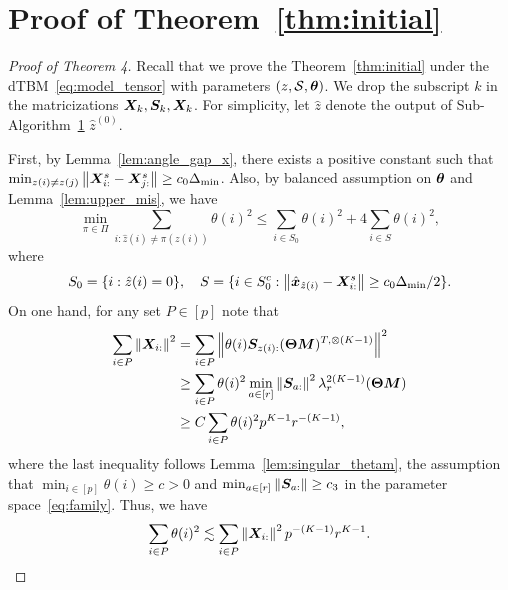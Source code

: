 \documentclass[lettersize,journal]{IEEEtran}
\theoremstyle{definition}
\theoremstyle{definition}
\begin{document}
\section*{Proof of Theorem~\ref{thm:initial}}
\begin{proof}[Proof of Theorem 4] Recall that we prove the Theorem~\ref{thm:initial} under the dTBM~\eqref{eq:model_tensor} with parameters $(z, \mathcal{S}, \boldsymbol{\theta})$. We drop the subscript $k$ in the matricizations $\bm X_k, \bm S_k, \bm X_k$. For simplicity, let $\hat z$ denote the output of Sub-Algorithm~\hyperref[alg:main]{1} $\hat z^{(0)}$.

First, by Lemma~\ref{lem:angle_gap_x}, there exists a positive constant such that $\min_{z(i) \neq z(j)} \left\lVert \bm X^s_{i:} - \bm X^s_{j:} \right\rVert \geq c_0  \Delta_{\min}$. Also, by balanced assumption on $\boldsymbol{\theta}$ and Lemma~\ref{lem:upper_mis}, we have 
 \begin{equation}\label{eq:theta_bound}
          \min_{\pi \in \Pi} \sum_{i : \hat z(i) \neq \pi(z(i))} \theta(i)^2  \leq  \sum_{i \in S_0} \theta(i)^2 + 4 \sum_{i \in S} \theta(i)^2 ,
    \end{equation}
    where 
    \begin{equation}
        S_0 = \{i: \hat z(i) = 0\}, \quad S = \{i \in S_0^c: \left\lVert\hat {\bm x}_{\hat z(i)} - \bm X_{i:}^s \right\rVert \geq c_0  \Delta_{\min}/2\}.
    \end{equation}
    On one hand, for any set $P \in [p]$ note that 
    \begin{align}
        \sum_{i \in P} \left\lVert\bm X_{i:}\right\rVert^2 &= \sum_{i \in P} \left\lVert \theta(i) \bm S_{z(i):} (\boldsymbol{\Theta} \bm M)^{T, \otimes (K-1)} \right\rVert^2 \\
        & \geq \sum_{i \in P} \theta(i)^2 \min_{a \in [r]} \left\lVert\bm S_{a:}\right\rVert^2 \lambda_{r}^{2(K-1)} (\boldsymbol{\Theta} \bm M)\\
        & \geq C \sum_{i \in P} \theta(i)^2 p^{K-1} r^{-(K-1)}, 
    \end{align}
    where the last inequality follows Lemma~\ref{lem:singular_thetam}, the assumption that $\min_{i \in [p]} \theta(i) \geq c >0$ and $\min_{a \in [r]} \left\lVert\bm S_{a:}\right\rVert \geq c_3$ in the parameter space~\eqref{eq:family}. Thus, we have 
    \begin{equation}\label{eq:theta_p}
        \sum_{i \in P} \theta(i)^2 \lesssim \sum_{i \in P} \onorm{\mX_{i:}}^2 p^{-(K-1)} r^{K-1}.
    \end{equation}
    

\end{proof}
\end{document}
